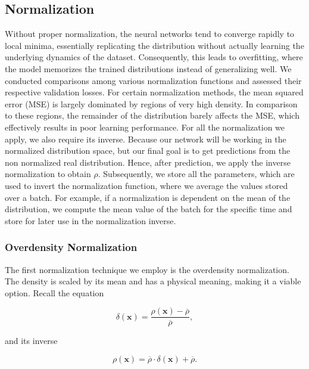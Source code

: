 \documentclass{article}
\begin{document}
\subsection{Normalization}

Without proper normalization, the neural networks tend to converge rapidly to local minima, essentially replicating the distribution without actually learning the underlying dynamics of the dataset. Consequently, this leads to overfitting, where the model memorizes the trained distributions instead of generalizing well. We conducted comparisons among various normalization functions and assessed their respective validation losses. For certain normalization methods, the mean squared error (MSE) is largely dominated by regions of very high density. In comparison to these regions, the remainder of the distribution barely affects the MSE, which effectively results in poor learning performance. For all the normalization we apply, we also require its inverse. Because our network will be working in the normalized distribution space, but our final goal is to get predictions from the non normalized real distribution. Hence, after prediction, we apply the inverse normalization to obtain $\rho$. Subsequently, we store all the parameters, which are used to invert the normalization function, where we average the values stored over a batch. For example, if a normalization is dependent on the mean of the distribution, we compute the mean value of the batch for the specific time and store for later use in the normalization inverse.

\subsubsection{Overdensity Normalization}

The first normalization technique we employ is the overdensity normalization. The density is scaled by its mean and has a physical meaning, making it a viable option. Recall the equation

\begin{equation}
    \delta(\mathbf{x}) = \frac{\rho(\mathbf{x}) - \overline{\rho}}{\overline{\rho}},
\end{equation}

and its inverse

\begin{equation}
    \rho(\mathbf{x}) = \overline{\rho} \cdot \delta(\mathbf{x}) + \overline{\rho}.
\end{equation}
\end{document}
